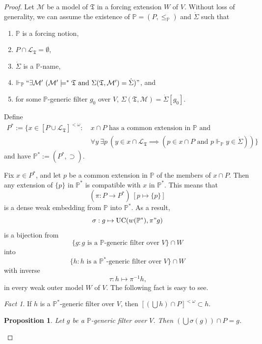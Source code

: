 \documentclass[12pt, twoside]{memoir}
\numberwithin{equation}{section}
\newtheorem{prop}[thm]{Proposition}
\theoremstyle{definition}
\theoremstyle{remark}
\newtheorem{fact}[thm]{Fact}
\theoremstyle{definition}
\theoremstyle{definition}
\theoremstyle{definition}
\theoremstyle{remark}
\begin{document}
\begin{proof}
Let $\mathcal{M}$ be a model of $\mathfrak{T}$ in a forcing extension $W$ of $V$. Without loss of generality, we can assume the existence of $\mathbb{P} = (P, \leq_{\mathbb{P}})$ and $\dot{\Sigma}$ such that
\begin{enumerate}[label=(\alph*)]
    \item $\mathbb{P}$ is a forcing notion,
    \item $P \cap \mathcal{L}_{\mathfrak{T}} = \emptyset$,
    \item $\dot{\Sigma}$ is a $\mathbb{P}$-name, 
    \item $\Vdash_{\mathbb{P}} ``\exists \mathcal{M}' \ (\mathcal{M}' \models^* \mathfrak{T} \text{ and } \Sigma(\mathfrak{T}, \mathcal{M}') = \dot{\Sigma})"$, and
    \item for some $\mathbb{P}$-generic filter $g_0$ over $V$, $\Sigma(\mathfrak{T}, \mathcal{M}) = \dot{\Sigma}[g_0]$.
\end{enumerate}
Define
\begin{align*}
    P^* := \{x \in [P \cup \mathcal{L}_{\mathfrak{T}}]^{< \omega} : \ & x \cap P \text{ has a common extension in } \mathbb{P} \text{ and} \\ 
    & \forall y \ \exists p \ (y \in x \cap \mathcal{L}_{\mathfrak{T}} \implies (p \in x \cap P \text{ and } p \Vdash_{\mathbb{P}} y \in \dot{\Sigma}))\}
\end{align*}
and have $\mathbb{P}^* := (P^*, \supset)$.

Fix $x \in P^*$, and let $p$ be a common extension in $\mathbb{P}$ of the members of $x \cap P$. Then any extension of $\{p\}$ in $\mathbb{P}^*$ is compatible with $x$ in $\mathbb{P}^*$. This means that $$(\pi : P \longrightarrow P^*) \ [p \mapsto \{p\}]$$ is a dense weak embedding from $\mathbb{P}$ into $\mathbb{P}^*$. As a result, $$\sigma : g \mapsto \mathrm{UC}(w(\mathbb{P}^*), \pi" g)$$ is a bijection from $$\{g : g \text{ is a } \mathbb{P} \text{-generic filter over } V\} \cap W$$ into $$\{h : h \text{ is a } \mathbb{P}^* \text{-generic filter over } V\} \cap W$$ with inverse $$\tau : h \mapsto \pi^{-1} h \text{,}$$ in every weak outer model $W$ of $V$. The following fact is easy to see.

\begin{fact}\label{cufs}
If $h$ is a $\mathbb{P}^*$-generic filter over $V$, then $[(\bigcup h) \cap P]^{< \omega} \subset h$.
\end{fact}

\begin{prop}\label{p524}
Let $g$ be a $\mathbb{P}$-generic filter over $V$. Then $(\bigcup \sigma(g)) \cap P = g$.
\end{prop}


\end{proof}
\end{document}
